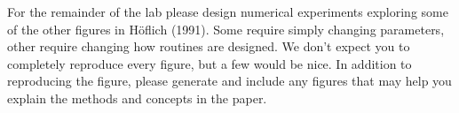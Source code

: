 \documentclass[12pt]{amsart}
\begin{document}
For the remainder of the lab please design numerical experiments
exploring some of the other figures in H\"oflich (1991).  Some require
simply changing parameters, other require changing how routines are
designed.  We don't expect you to completely reproduce every figure,
but a few would be nice.  In addition to reproducing the figure,
please generate and include any figures that may help you explain the
methods and concepts in the paper.
\end{document}

